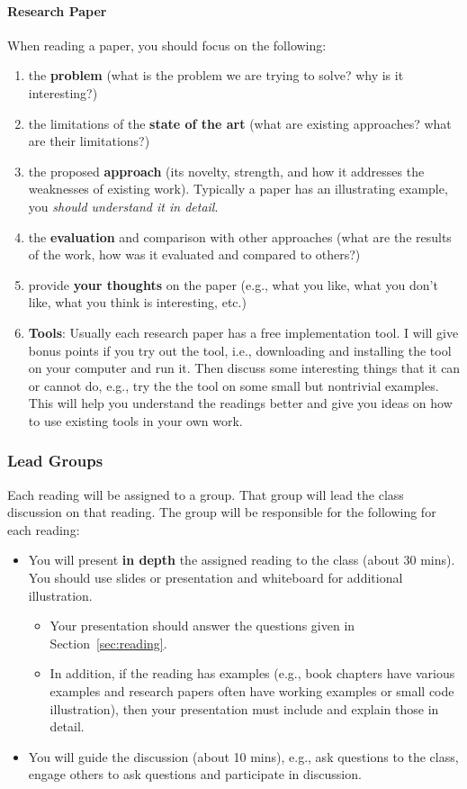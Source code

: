 \documentclass[11pt]{article}
\begin{document}
\paragraph{Research Paper} When reading a paper, you should focus on the following: 
\begin{enumerate}
    \item the \textbf{problem} (what is the problem we are trying to solve? why is it interesting?)
    \item the limitations of the \textbf{state of the art} (what are existing approaches? what are their limitations?)
    \item the proposed \textbf{approach} (its novelty, strength, and how it  addresses the weaknesses of  existing work). Typically a paper has an illustrating example, you \emph{should understand it in detail}.
    \item the \textbf{evaluation} and comparison with other approaches (what are the results of the work, how was it evaluated and compared to others?)
    \item provide \textbf{your thoughts} on the paper (e.g., what you like, what you don't like, what you think is interesting, etc.)
    \item \textbf{\textbf{Tools}}: Usually each research paper has a free implementation
tool. I will give bonus points if you try out the
tool, i.e., downloading and installing the tool on your computer and run it. 
Then discuss some interesting things that it can or cannot do, e.g., try the the tool on some small but nontrivial examples. 
This will help you understand the readings better and give you ideas on how to use existing tools in your own work.
\end{enumerate}
    
\subsubsection{Lead Groups} Each reading will be assigned to a group.  That group will lead the class discussion on that reading. The group will be responsible for the following for each reading:
\begin{itemize}
\item You will present \textbf{\textbf{in depth}} the assigned reading to the class (about 30 mins). You should use slides or presentation and whiteboard for additional illustration.
\begin{itemize}
    \item Your presentation should answer the questions given in Section~\ref{sec:reading}.
    \item In addition, if the reading has examples (e.g., book chapters have various examples and research papers often have working examples or small code illustration), then your presentation must include and explain those in detail.
\end{itemize}
\item You will guide the discussion (about 10 mins), e.g., ask questions to the class, engage others to ask questions and participate in discussion.


\end{itemize}
\end{document}
